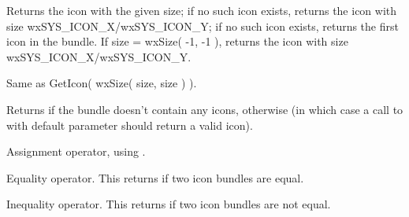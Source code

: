 \label{wxiconbundlegeticon}


Returns the icon with the given size; if no such icon exists,
returns the icon with size wxSYS\_ICON\_X/wxSYS\_ICON\_Y;
if no such icon exists,
returns the first icon in the bundle. If size = wxSize( -1, -1 ),
returns the icon with size wxSYS\_ICON\_X/wxSYS\_ICON\_Y.


Same as GetIcon( wxSize( size, size ) ).


\label{wxiconbundleisempty}


Returns \true if the bundle doesn't contain any icons, \false otherwise (in
which case a call to  with default
parameter should return a valid icon).


\label{wxiconbundleoperatorassign}


Assignment operator, using .


\label{wxiconbundleoperatorequals}


Equality operator. This returns \true if two icon bundles are equal.


\label{wxiconbundleoperatornotequals}


Inequality operator. This returns \true if two icon bundles are not equal.

